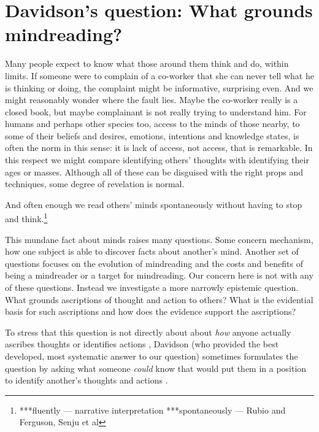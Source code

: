 \documentclass[12pt,letterpaper]{extarticle}
\begin{document}
\setlength\footnotesep{1em}


\maketitle

\begin{abstract}
***
\end{abstract}


\section{Davidson's question: What grounds mindreading?}
Many people expect to know what those around them think and do, within limits.
If someone were to complain of a co-worker that she can never tell what he is thinking or doing,
the complaint might be informative, surprising even.
And we might reasonably wonder where the fault lies.
Maybe the co-worker really is a closed book,
but maybe complainant is not really trying to understand him.
For humans and perhaps other species too,
access to the minds of those nearby,
to some of their beliefs and desires,
emotions, intentions and knowledge states,
is often the norm in this sense: it is lack of access, not access, that is remarkable.
In this respect we might compare identifying others' thoughts with identifying their ages or masses.
Although all of these can be disguised with the right props and techniques, some degree of revelation is normal.

And often enough we read others' minds spontaneously
without having to stop and think.\footnote{
***fluently --- narrative interpretation
***spontaneously --- Rubio and Ferguson, Senju et al
}

This mundane fact about minds raises many questions.
Some concern mechanism, how one subject is able to discover facts about another's mind.
Another set of questions focuses on the evolution of mindreading and the costs and benefits of being a mindreader or a target for mindreading.
Our concern here is not with any of these questions.
Instead we investigate a more narrowly epistemic question.
What grounds ascriptions of thought and action to others?
What is the evidential basis for such ascriptions and how does the evidence support the ascriptions?

To stress that this question is not directly about about \emph{how} anyone actually ascribes thoughts or identifies actions%
, Davidson (who provided the best developed, most systematic answer to our question)
sometimes formulates the question by asking what someone \emph{could} know that would put them in a position to identify another's thoughts and actions \citep[e.g.][p.\ 126]{Davidson:1973jx}.
\end{document}
